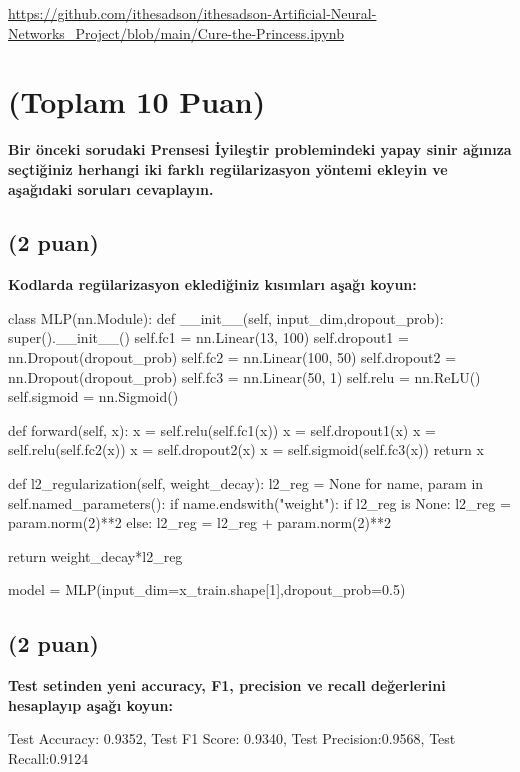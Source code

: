 \documentclass[11pt]{article}
\begin{document}
\url{https://github.com/ithesadson/ithesadson-Artificial-Neural-Networks_Project/blob/main/Cure-the-Princess.ipynb}

\section{(Toplam 10 Puan)} \textbf{Bir önceki sorudaki Prensesi İyileştir problemindeki yapay sinir ağınıza seçtiğiniz herhangi iki farklı regülarizasyon yöntemi ekleyin ve aşağıdaki soruları cevaplayın.} 

\subsection{(2 puan)} \textbf{Kodlarda regülarizasyon eklediğiniz kısımları aşağı koyun:} 

\begin{python}
class MLP(nn.Module):
    def __init__(self, input_dim,dropout_prob):
        super().__init__()
        self.fc1 = nn.Linear(13, 100)
        self.dropout1 = nn.Dropout(dropout_prob)
        self.fc2 = nn.Linear(100, 50)
        self.dropout2 = nn.Dropout(dropout_prob)
        self.fc3 = nn.Linear(50, 1)
        self.relu = nn.ReLU()
        self.sigmoid = nn.Sigmoid()

    def forward(self, x):
        x = self.relu(self.fc1(x))
        x = self.dropout1(x)
        x = self.relu(self.fc2(x))
        x = self.dropout2(x)
        x = self.sigmoid(self.fc3(x))
        return x
    
    def l2_regularization(self, weight_decay):
        l2_reg = None
        for name, param in self.named_parameters():
            if name.endswith("weight"):
                if l2_reg is None:
                    l2_reg = param.norm(2)**2
                else:
                    l2_reg = l2_reg + param.norm(2)**2

        return weight_decay*l2_reg

model = MLP(input_dim=x_train.shape[1],dropout_prob=0.5)
\end{python}

\subsection{(2 puan)} \textbf{Test setinden yeni accuracy, F1, precision ve recall değerlerini hesaplayıp aşağı koyun:}

Test Accuracy: 0.9352, Test F1 Score: 0.9340, Test Precision:0.9568, Test Recall:0.9124
\end{document}
